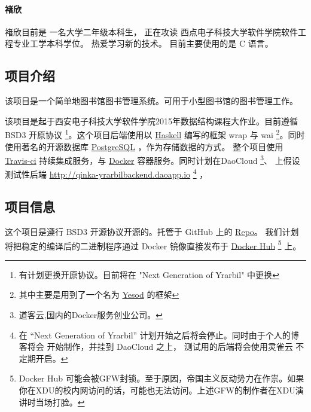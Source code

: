 \paragraph{褚欣}
褚欣目前是 一名大学二年级本科生，
正在攻读 西点电子科技大学软件学院软件工程专业工学本科学位。
热爱学习新的技术。
目前主要使用的是 C 语言。


\subsection*{项目介绍}
该项目是一个简单地图书馆图书管理系统。可用于小型图书馆的图书管理工作。

该项目是起于西安电子科技大学软件学院2015年数据结构课程大作业。目前遵循 BSD3 开原协议 \footnote{有计划更换开原协议。目前将在 "Next Generation of Yrarbil" 中更换}。这个项目后端使用以 \href{https://www.haskell.org}{Haskell} 编写的框架 wrap 与 wai \footnote{其中主要是用到了一个名为 \href{https://www.yesodweb.com}{Yesod} 的框架}。同时使用著名的开源数据库
\href{http://www.postgresql.org}{PostgreSQL} ，作为存储数据的方式。
整个项目使用 \href{https://travis-ci.org}{Travis-ci} 持续集成服务，与 \href{https://www.docker.com/}{Docker} 容器服务。同时计划在DaoCloud \footnote{道客云,国内的Docker服务创业公司。}、
上假设测试性后端 \href{YrabilBackend on DaoCloud}{http://qinka-yrarbilbackend.daoapp.io}
\footnote{在 “Next Generation of Yrarbil” 计划开始之后将会停止。同时由于个人的博客将会
    开始制作，并挂到 DaoCloud 之上， 测试用的后端将会使用灵雀云 不定期开启。} ，

\subsection*{项目信息}
这个项目是遵行 BSD3 开源协议开源的。托管于 GitHub 上的   \href{https://github.com/XDUDsTeam/}{Repo}。
我们计划将把稳定的编译后的二进制程序通过 Docker 镜像直接发布于
\href{https://hub.docker.com/}{Docker Hub}
\footnote{Docker Hub 可能会被GFW封锁。\tiny{至于原因，帝国主义反动势力在作祟。}如果你在XDU的校内网访问的话，可能也无法访问。上述GFW的制作者在XDU演讲时当场打脸。}
上。


